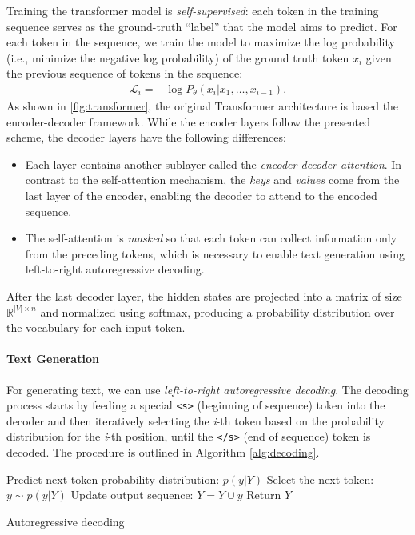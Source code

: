 {Training the transformer model is \emph{self-supervised}: each token in the training sequence serves as the ground-truth ``label'' that the model aims to predict. For each token in the sequence, we train the model to maximize the log probability (i.e., minimize the negative log probability) of the ground truth token $x_i$ given the previous sequence of tokens in the sequence:
\begin{align}
  \mathcal{L}_i = -\log P_\theta(x_i|x_1, \hdots, x_{i-1}).
\end{align}
As shown in \autoref{fig:transformer}, the original Transformer architecture is based the encoder-decoder framework. While the encoder layers follow the presented scheme, the decoder layers have the following differences:
\begin{itemize}
  \item Each layer contains another sublayer called the \emph{encoder-decoder attention}. In contrast to the self-attention mechanism, the \emph{keys} and \emph{values} come from the last layer of the encoder, enabling the decoder to attend to the encoded sequence.
  \item The self-attention is \emph{masked} so that each token can collect information only from the preceding tokens, which is necessary to enable text generation using left-to-right autoregressive decoding.
\end{itemize}
After the last decoder layer, the hidden states are projected into a matrix of size $\mathbb{R}^{|V|\times n}$ and normalized using softmax, producing a probability distribution over the vocabulary for each input token.

\paragraph{Text Generation} For generating text, we can use \textit{left-to-right autoregressive decoding}. The decoding process starts by feeding a special \texttt{<s>} (beginning of sequence) token into the decoder and then iteratively selecting the \emph{i}-th token based on the probability distribution for the \emph{i}-th position, until the  \texttt{</s>} (end of sequence) token is decoded. The procedure is outlined in Algorithm \ref{alg:decoding}.
\begin{algorithm}[ht]
  \begin{algorithmic}[1]
    \State Predict next token probability distribution: $p(y | Y)$
    \State Select the next token: $y \sim p(y | Y)$ \label{alg:dec:sample}
    \State Update output sequence: $Y = Y \cup y$
    \EndWhile
    \State Return $Y$
  \end{algorithmic}
  \caption{Autoregressive decoding}
  \label{alg:decoding}
\end{algorithm}

}
